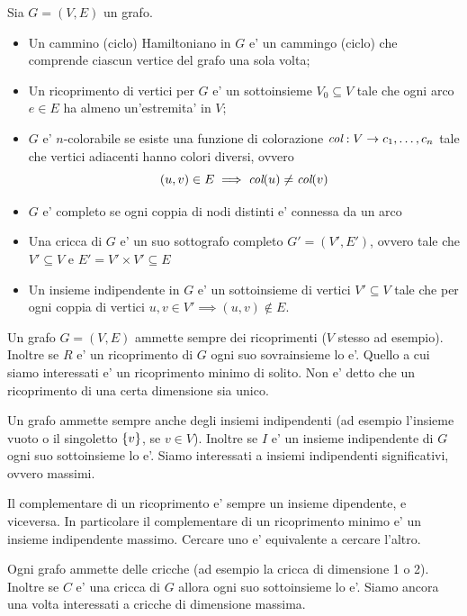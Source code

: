 \begin{defn}
    Sia $G = (V,E)$ un grafo.
    \begin{itemize}
        \item Un cammino (ciclo) Hamiltoniano in $G$ e' un cammingo (ciclo) che comprende ciascun
        vertice del grafo una sola volta;
        \item Un ricoprimento di vertici per $G$ e' un sottoinsieme $V_{0} \subseteq V$ tale che
        ogni arco $e \in E$ ha almeno un'estremita' in $V$;
        \item $G$ e' $n$-colorabile se esiste una funzione di colorazione $\textit{col}: V \to
        c_{1},\dotsc,c_{n}$ tale che vertici adiacenti hanno colori diversi, ovvero
        \begin{equation*}
            (u,v) \in E \implies \textit{col}(u) \not= \textit{col}(v)
        \end{equation*}
        \item $G$ e' completo se ogni coppia di nodi distinti e' connessa da un arco
        \item Una cricca di $G$ e' un suo sottografo completo $G' = (V',E')$, ovvero tale che $V'
        \subseteq V$ e $E' = V' \times V' \subseteq E$
        \item Un insieme indipendente in $G$ e' un sottoinsieme di vertici $V' \subseteq V$ tale che
        per ogni coppia di vertici $u,v \in V' \implies (u,v) \notin E$.
    \end{itemize}
\end{defn}

Un grafo $G=(V,E)$ ammette sempre dei ricoprimenti ($V$ stesso ad esempio). Inoltre se $R$ e' un
ricoprimento di $G$ ogni suo sovrainsieme lo e'. Quello a cui siamo interessati e' un ricoprimento
minimo di solito. Non e' detto che un ricoprimento di una certa dimensione sia unico.

Un grafo ammette sempre anche degli insiemi indipendenti (ad esempio l'insieme vuoto o il singoletto
$\{v\}$, se $v \in V$). Inoltre se $I$ e' un insieme indipendente di $G$ ogni suo sottoinsieme lo
e'. Siamo interessati a insiemi indipendenti significativi, ovvero massimi.

Il complementare di un ricoprimento e' sempre un insieme dipendente, e viceversa. In particolare il
complementare di un ricoprimento minimo e' un insieme indipendente massimo. Cercare uno e'
equivalente a cercare l'altro.

Ogni grafo ammette delle cricche (ad esempio la cricca di dimensione 1 o 2). Inoltre se $C$ e' una
cricca di $G$ allora ogni suo sottoinsieme lo e'. Siamo ancora una volta interessati a cricche di
dimensione massima.

